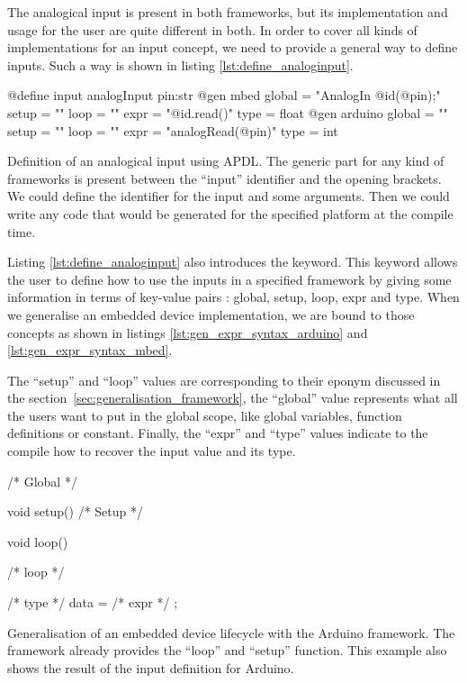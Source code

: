 The analogical input is present in both frameworks, but its implementation and
usage for the user are quite different in both. In order to cover all kinds of
implementations for an input concept, we need to provide a general way to define
inputs. Such a way is shown in listing \ref{lst:define_analoginput}.

\begin{listing}[H]
  \centering
\begin{apdlcode}
@define input analogInput pin:str {
    @gen mbed {
        global = "AnalogIn @id(@pin);"
        setup = ""
        loop = ""
        expr = "@id.read()"
        type = float
    }
    @gen arduino {
        global = ""
        setup = ""
        loop = ""
        expr = "analogRead(@pin)"
        type = int
    }
}
\end{apdlcode}
  \caption[Definition of an analogical input using \gls{APDL}]{Definition of an
analogical input using \gls{APDL}. The generic part for any kind of frameworks is
present between the ``input'' identifier and the opening brackets. We could
define the identifier for the input and some arguments. Then we could write any
code that would be generated for the specified platform at the compile time.}
  \label{lst:define_analoginput}
\end{listing}

Listing \ref{lst:define_analoginput} also introduces the 
keyword. This keyword allows the user to define how to use the inputs in a
specified framework by giving some information in terms of key-value pairs :
global, setup, loop, expr and type. When we generalise an embedded device
implementation, we are bound to those concepts as shown in listings
\ref{lst:gen_expr_syntax_arduino} and \ref{lst:gen_expr_syntax_mbed}.

The ``setup'' and ``loop'' values are corresponding to their eponym discussed in
the section~\ref{sec:generalisation_framework}, the ``global'' value represents what all the
users want to put in the global scope, like global variables, function
definitions or constant. Finally, the ``expr'' and ``type'' values indicate to the compile how
to recover the input value and its type.

\begin{listing}[H]
  \centering
\begin{arduinocode}
/* Global */

void setup(){
  /* Setup */
}

void loop(){
  /* loop */

  /* type */ data = /* expr */ ;
}
\end{arduinocode}
  \caption[Generalisation of an embedded device lifecycle with
Arduino]{Generalisation of an embedded device lifecycle with the Arduino
framework. The framework already provides the ``loop'' and ``setup'' function.
This example also shows the result of the input definition for Arduino.}
  \label{lst:gen_expr_syntax_arduino}
\end{listing}

